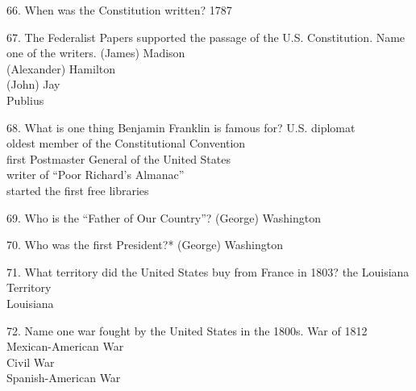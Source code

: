 \documentclass[avery5371,frame]{flashcards}
\begin{document}
        \begin{flashcard}{66. When was the Constitution written?}
        {1787}
        \end{flashcard}
        \begin{flashcard}{67. The Federalist Papers supported the passage of the U.S. Constitution. Name one of the writers.}
        {(James) Madison\\(Alexander) Hamilton\\(John) Jay\\Publius}
        \end{flashcard}
        \begin{flashcard}{68. What is one thing Benjamin Franklin is famous for?}
        {U.S. diplomat\\oldest member of the Constitutional Convention\\first Postmaster General of the United States\\writer of “Poor Richard’s Almanac”\\started the first free libraries}
        \end{flashcard}
        \begin{flashcard}{69. Who is the “Father of Our Country”?}
        {(George) Washington}
        \end{flashcard}
        \begin{flashcard}{70. Who was the first President?*}
        {(George) Washington}
        \end{flashcard}
        \begin{flashcard}{71. What territory did the United States buy from France in 1803?}
        {the Louisiana Territory\\Louisiana}
        \end{flashcard}
        \begin{flashcard}{72. Name one war fought by the United States in the 1800s.}
        {War of 1812\\Mexican-American War\\Civil War\\Spanish-American War}
        \end{flashcard}
\end{document}
